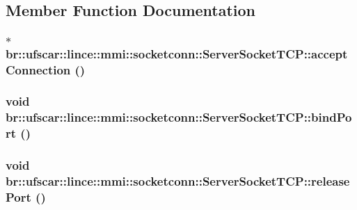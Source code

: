\subsection{Member Function Documentation}
\hypertarget{classbr_1_1ufscar_1_1lince_1_1mmi_1_1socketconn_1_1ServerSocketTCP_ae47a3a55c453925c7925787487b0d80b}{
\subsubsection[{acceptConnection}]{$\ast$ br::ufscar::lince::mmi::socketconn::ServerSocketTCP::acceptConnection ()}}
\label{classbr_1_1ufscar_1_1lince_1_1mmi_1_1socketconn_1_1ServerSocketTCP_ae47a3a55c453925c7925787487b0d80b}
\hypertarget{classbr_1_1ufscar_1_1lince_1_1mmi_1_1socketconn_1_1ServerSocketTCP_a178273f9acb926091d947e8824499c39}{
\subsubsection[{bindPort}]{\setlength{\rightskip}{0pt plus 5cm}void br::ufscar::lince::mmi::socketconn::ServerSocketTCP::bindPort ()}}
\label{classbr_1_1ufscar_1_1lince_1_1mmi_1_1socketconn_1_1ServerSocketTCP_a178273f9acb926091d947e8824499c39}
\hypertarget{classbr_1_1ufscar_1_1lince_1_1mmi_1_1socketconn_1_1ServerSocketTCP_a1f1be1ca0f733cf4caee8bd93b6a00eb}{
\subsubsection[{releasePort}]{\setlength{\rightskip}{0pt plus 5cm}void br::ufscar::lince::mmi::socketconn::ServerSocketTCP::releasePort ()}}
\label{classbr_1_1ufscar_1_1lince_1_1mmi_1_1socketconn_1_1ServerSocketTCP_a1f1be1ca0f733cf4caee8bd93b6a00eb}
